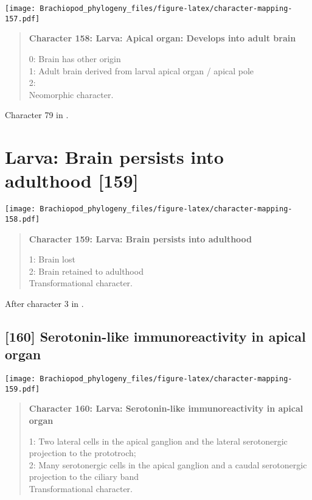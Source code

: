 \documentclass[openany]{book}
\theoremstyle{definition}
\theoremstyle{definition}
\theoremstyle{definition}
\theoremstyle{remark}
\begin{document}
\texttt{[image: Brachiopod\_phylogeny\_files/figure-latex/character-mapping-157.pdf]}

\begin{quote}
\textbf{Character 158: Larva: Apical organ: Develops into adult brain}

0: Brain has other origin\\
1: Adult brain derived from larval apical organ / apical pole\\
2:\\
Neomorphic character.
\end{quote}

Character 79 in \citet{Glenner2004}.

\section{Larva: Brain persists into adulthood
{[}159{]}}\label{larva-brain-persists-into-adulthood-159}

\texttt{[image: Brachiopod\_phylogeny\_files/figure-latex/character-mapping-158.pdf]}

\begin{quote}
\textbf{Character 159: Larva: Brain persists into adulthood}

1: Brain lost\\
2: Brain retained to adulthood\\
Transformational character.
\end{quote}

After character 3 in \citet{Richter2010}.

\subsection*{{[}160{]} Serotonin-like immunoreactivity in apical
organ}\label{serotonin-like-immunoreactivity-in-apical-organ}

\texttt{[image: Brachiopod\_phylogeny\_files/figure-latex/character-mapping-159.pdf]}

\begin{quote}
\textbf{Character 160: Larva: Serotonin-like immunoreactivity in apical
organ}

1: Two lateral cells in the apical ganglion and the lateral serotonergic
projection to the prototroch;\\
2: Many serotonergic cells in the apical ganglion and a caudal
serotonergic projection to the ciliary band\\
Transformational character.
\end{quote}
\end{document}
